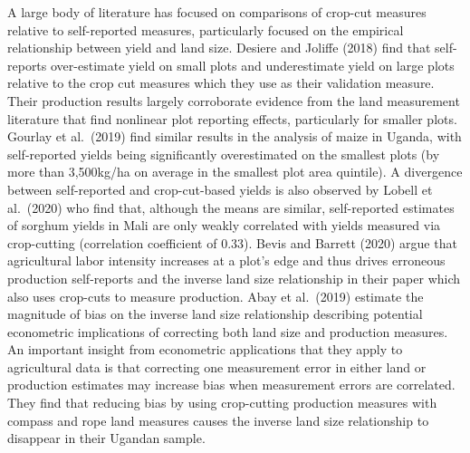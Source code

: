\documentclass[
]{book}
\begin{document}
A large body of literature has focused on comparisons of crop-cut measures relative to self-reported measures, particularly focused on the empirical relationship between yield and land size. Desiere and Joliffe (2018) find that self-reports over-estimate yield on small plots and underestimate yield on large plots relative to the crop cut measures which they use as their validation measure. Their production results largely corroborate evidence from the land measurement literature that find nonlinear plot reporting effects, particularly for smaller plots. Gourlay et al.~(2019) find similar results in the analysis of maize in Uganda, with self-reported yields being significantly overestimated on the smallest plots (by more than 3,500kg/ha on average in the smallest plot area quintile). A divergence between self-reported and crop-cut-based yields is also observed by Lobell et al.~(2020) who find that, although the means are similar, self-reported estimates of sorghum yields in Mali are only weakly correlated with yields measured via crop-cutting (correlation coefficient of 0.33). Bevis and Barrett (2020) argue that agricultural labor intensity increases at a plot's edge and thus drives erroneous production self-reports and the inverse land size relationship in their paper which also uses crop-cuts to measure production. Abay et al.~(2019) estimate the magnitude of bias on the inverse land size relationship describing potential econometric implications of correcting both land size and production measures. An important insight from econometric applications that they apply to agricultural data is that correcting one measurement error in either land or production estimates may increase bias when measurement errors are correlated. They find that reducing bias by using crop-cutting production measures with compass and rope land measures causes the inverse land size relationship to disappear in their Ugandan sample.
\end{document}
